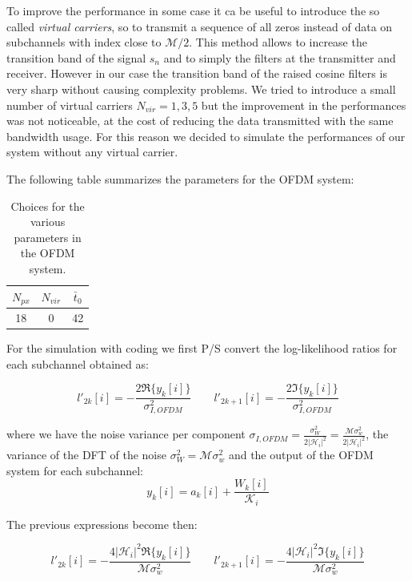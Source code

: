 \documentclass[a4paper,11.5pt]{article}
\begin{document}
To improve the performance in some case it ca be useful to introduce the so called \emph{virtual carriers}, so to transmit a sequence of all zeros instead of data on subchannels with index close to $\mathcal{M}/2$. This method allows to increase the transition band of the signal $s_n$ and to simply the filters at the transmitter and receiver. However in our case the transition band of the raised cosine filters is very sharp without causing complexity problems. We tried to introduce a small number of virtual carriers $N_{vir} = 1,3,5$ but the improvement in the performances was not noticeable, at the cost of reducing the data transmitted with the same bandwidth usage. For this reason we decided to simulate the performances of our system without any virtual carrier.

The following table summarizes the parameters for the OFDM system:

\begin{table}[htbp]
	\begin{center}
		\begin{tabular}{ccc}
			\toprule
			$N_{px}$ & $N_{vir}$ &$\bar{t}_0$ \\
			\midrule
			18 & 0 & 42 \\
			\bottomrule
		\end{tabular}
	\end{center}
	\label{tab:sumup2}
	\caption{Choices for the various parameters in the OFDM system.}
\end{table} 

For the simulation with coding we first P/S convert the log-likelihood ratios for each subchannel obtained as:

\begin{equation}
l'_{2k}[i] =- \frac{2 \Re\{y_k[i]\}}{\sigma_{I,OFDM}^2} \quad \quad
l'_{2k+1}[i]= - \frac{2 \Im\{y_k[i]\}}{\sigma_{I,OFDM}^2}
\end{equation}

where we have the noise variance per component $\sigma_{I,OFDM} = \frac{\sigma_W^2}{2 |\mathcal{H}_i|^2}=\frac{\mathcal{M} \sigma_w^2}{2 |\mathcal{H}_i|^2}$, the variance of the DFT of the noise $\sigma_W^2 = \mathcal{M} \sigma_w^2$ and the output of the OFDM system for each subchannel:
\begin{equation} \label{eq:outOFDM}
 y_k[i] = a_k[i] + \frac{W_k[i]}{\mathcal{K}_i}
\end{equation}

The previous expressions become then:

\begin{equation}
l'_{2k}[i] =- \frac{4 |\mathcal{H}_i|^2 \Re\{y_k[i]\}}{\mathcal{M}\sigma_w^2} \quad \quad
l'_{2k+1}[i]= - \frac{4 |\mathcal{H}_i|^2 \Im\{y_k[i]\}}{\mathcal{M}\sigma_w^2}
\end{equation}
\end{document}
